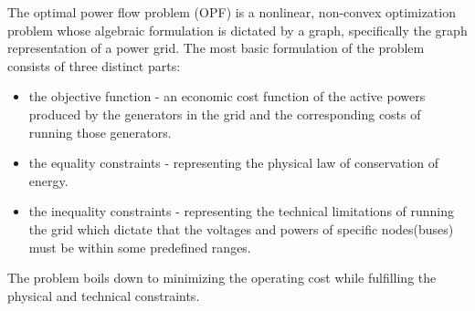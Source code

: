The optimal power flow problem (OPF) is a nonlinear, non-convex optimization problem\cite{cain2012history, bienstock2019strong} whose algebraic formulation is dictated by a graph,
specifically the graph representation of a power grid.
The most basic formulation of the problem consists of three distinct parts:

\begin{itemize}
    \item the objective function - an economic cost function of the active powers produced by the generators in
    the grid and the corresponding costs of running those generators.

    \item the equality constraints - representing the physical law of conservation of energy.

    \item the inequality constraints - representing the technical limitations of running the grid which dictate that
    the voltages and powers of specific nodes(buses) must be within some predefined ranges.
\end{itemize}

The problem boils down to minimizing the operating cost while fulfilling the physical and technical constraints.